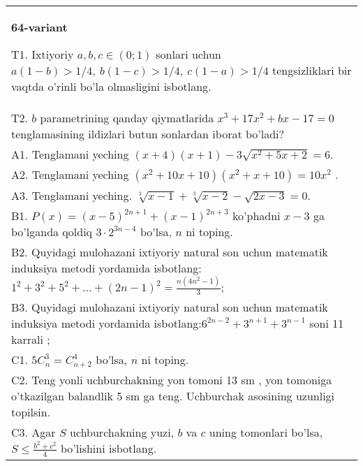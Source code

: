 \documentclass{article}
\begin{document}
\begin{tabular}{m{17cm}}
\textbf{64-variant}
\newline

T1. Ixtiyoriy \(a,b,c \in (0;1)\) sonlari uchun \(a(1 - b) > 1/4,\ b(1 - c) > 1/4,\ c(1 - a) > 1/4\) tengsizliklari bir vaqtda o'rinli bo'la olmasligini isbotlang. \\
T2. \(b\) parametrining qanday qiymatlarida \(x^{3} + 17x^{2} + bx - 17 = 0\) tenglamasining ildizlari butun sonlardan iborat bo'ladi? \\
A1. Tenglamani yeching \((x + 4)(x + 1) - 3\sqrt{x^{2} + 5x + 2} = 6\). \\
A2. Tenglamani yeching \(\left( x^{2} + 10x + 10 \right)\left( x^{2} + x + 10 \right) = 10x^{2}\) . \\
A3. Tenglamani yeching. \(\sqrt[3]{x - 1} + \sqrt[3]{x - 2} - \sqrt{2x - 3} = 0\). \\
B1. \(P(x) = (x - 5)^{2n + 1} + (x - 1)^{2n + 3}\) ko'phadni \(x - 3\) ga bo'lganda qoldiq \(3 \cdot 2^{3n - 4}\) bo'lsa, \(n\) ni toping. \\
B2. Quyidagi mulohazani ixtiyoriy natural son uchun matematik induksiya metodi yordamida isbotlang: \(1^{2} + 3^{2} + 5^{2} + ... + (2n - 1)^{2} = \frac{n\left( 4n^{2} - 1 \right)}{3}\); \\
B3. Quyidagi mulohazani ixtiyoriy natural son uchun matematik induksiya metodi yordamida isbotlang:\(6^{2n - 2} + 3^{n + 1} + 3^{n - 1}\) soni 11 karrali ; \\
C1. \(5C_{n}^{3} = C_{n + 2}^{4}\) bo'lsa, \(n\) ni toping. \\
C2. Teng yonli uchburchakning yon tomoni 13 sm , yon tomoniga o'tkazilgan balandlik 5 sm ga teng. Uchburchak asosining uzunligi topilsin. \\
C3. Agar \(S\) uchburchakning yuzi, \(b\) va \(c\) uning tomonlari bo'lsa, \(S \leq \frac{b^{2} + c^{2}}{4}\) bo'lishini isbotlang. \\

\end{tabular}
\vspace{1cm}
\end{document}
